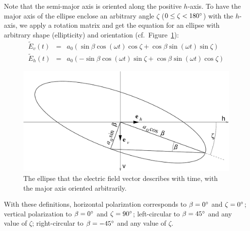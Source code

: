 Note that the semi-major axis is oriented along the positive $h$-axis.
To have the major axis of the ellipse enclose an arbitrary angle
$\zeta$ ($0 \leq \zeta < 180^\circ$) with the $h$-axis, we apply a
rotation matrix and get the equation for an ellipse with arbitrary
shape (ellipticity) and orientation (cf.\
Figure~\ref{fig:polarization:ellipse_arbitrary}):
\begin{eqnarray}
  \label{eq:polarization:ellipse_rotated1}
 \tilde{E}_v (t) &=&  a_0(  \sin\beta \cos(\omega t) \cos\zeta
                           +\cos\beta \sin(\omega t) \sin\zeta )\\
  \label{eq:polarization:ellipse_rotated2}
 \tilde{E}_h (t) &=&  a_0( -\sin\beta \cos(\omega t) \sin\zeta
                           +\cos\beta \sin(\omega t) \cos\zeta )
\end{eqnarray}
%
\begin{figure}[!h]
 \begin{center}
  \begin{minipage}[c]{0.9\textwidth}
   \begin{center}
    \includegraphics*[width=0.9\hsize]{Figs/polarization/pol_ellipse_arbitrary}
   \end{center}
  \end{minipage}
  \begin{minipage}[c]{0.9\textwidth}
   \caption{The ellipse that the electric field vector describes with
     time, with the major axis oriented arbitrarily.}
   \label{fig:polarization:ellipse_arbitrary}
  \end{minipage}
 \end{center}
\end{figure}   
With these definitions, horizontal polarization corresponds to
$\beta=0^\circ$ and $\zeta=0^\circ$; vertical polarization to 
$\beta=0^\circ$ and $\zeta=90^\circ$; left-circular to 
$\beta=45^\circ$ and any value of $\zeta$; right-circular to 
$\beta=-45^\circ$ and any value of $\zeta$.
    
